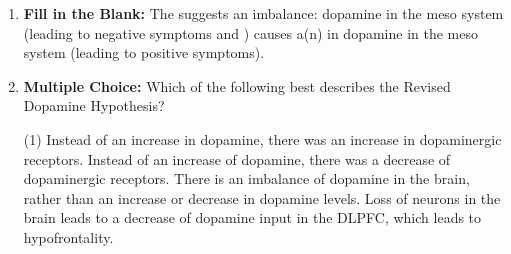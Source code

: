 \begin{enumerate}[label=\textbf{Q4.1.\arabic*}]

    \item \textbf{Fill in the Blank:} The \underline{\hspace{3cm}} suggests an imbalance: \underline{\hspace{3cm}} dopamine in the meso\underline{\hspace{2cm}} system (leading to negative symptoms and \underline{\hspace{3cm}}) causes a(n) \underline{\hspace{3cm}} in dopamine in the meso\underline{\hspace{2cm}} system (leading to positive symptoms).
\newpage

    \item \textbf{Multiple Choice:} Which of the following best describes the Revised Dopamine Hypothesis?
    \begin{tasks}[label=\textcolor{\documentTheme}{(\Alph*)}, item-format=\color{\documentTheme}, label-width=1.5em, item-indent=1.7em](1)
        \task Instead of an increase in dopamine, there was an increase in dopaminergic receptors.
        \task Instead of an increase of dopamine, there was a decrease of dopaminergic receptors.
        \task There is an imbalance of dopamine in the brain, rather than an increase or decrease in dopamine levels.
        \task Loss of neurons in the brain leads to a decrease of dopamine input in the DLPFC, which leads to hypofrontality.
    \end{tasks}


\end{enumerate}
